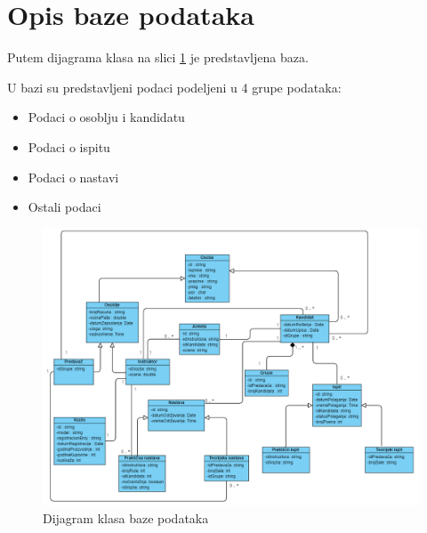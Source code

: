 \section {Opis baze podataka}
\label{sec:database}

Putem dijagrama klasa na slici \ref{fig:dijagram_klasa} je predstavljena baza.

U bazi su predstavljeni podaci podeljeni u 4 grupe podataka:
\begin{itemize}
    \item Podaci o osoblju i kandidatu
    \item Podaci o ispitu
    \item Podaci o nastavi
    \item Ostali podaci
\end{itemize}







\begin{figure}[H]
    \begin{center}
        \includegraphics[width=\textwidth]{Diagrams/dijagram_klasa.png}
        \caption {Dijagram klasa baze podataka}
        \label{fig:dijagram_klasa}
    \end{center}
\end{figure}